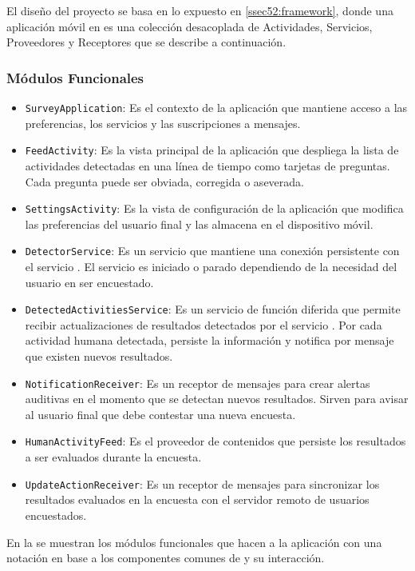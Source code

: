 El diseño del proyecto se basa en lo expuesto en \ref{ssec52:framework},
donde una aplicación móvil en  es una colección desacoplada
de Actividades, Servicios, Proveedores y Receptores que se describe
a continuación.

\subsubsection{Módulos Funcionales}
\begin{itemize}
\item \texttt{\small{}SurveyApplication}: Es el contexto de la aplicación
que mantiene acceso a las preferencias, los servicios y las suscripciones
a mensajes.
\item \texttt{\small{}FeedActivity}: Es la vista principal de la aplicación
que despliega la lista de actividades detectadas en una línea de tiempo
como tarjetas de preguntas. Cada pregunta puede ser obviada, corregida
o aseverada. 
\item \texttt{\small{}SettingsActivity}: Es la vista de configuración de
la aplicación que modifica las preferencias del usuario final y las
almacena en el dispositivo móvil.
\item \texttt{\small{}DetectorService}: Es un servicio que mantiene una
conexión persistente con el servicio . El servicio es iniciado
o parado dependiendo de la necesidad del usuario en ser encuestado.
\item \texttt{\small{}DetectedActivitiesService}: Es un servicio de función
diferida que permite recibir actualizaciones de resultados detectados
por el servicio . Por cada actividad humana detectada,
persiste la información y notifica por mensaje que existen nuevos
resultados.
\item \texttt{\small{}NotificationReceiver}: Es un receptor de mensajes
para crear alertas auditivas en el momento que se detectan nuevos
resultados. Sirven para avisar al usuario final que debe contestar
una nueva encuesta.
\item \texttt{\small{}HumanActivityFeed}: Es el proveedor de contenidos
que persiste los resultados a ser evaluados durante la encuesta.
\item \texttt{\small{}UpdateActionReceiver}: Es un receptor de mensajes
para sincronizar los resultados evaluados en la encuesta con el servidor
remoto de usuarios encuestados.
\end{itemize}
En la  se muestran los módulos funcionales
que hacen a la aplicación con una notación en base a los componentes
comunes de  y su interacción. 

